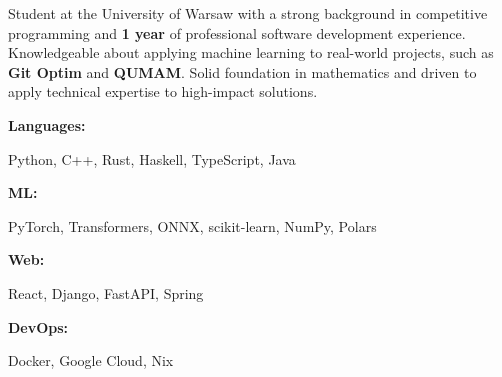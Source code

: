 \documentclass[8pt]{developercv} %
\begin{document}

\begin{minipage}[t]{0.45\textwidth}
	\vspace{-6pt}
 
	Student at the University of Warsaw with a strong background in competitive programming and \textbf{1 year} of professional software development experience. Knowledgeable about applying machine learning to real-world projects, such as \textbf{Git Optim} and \textbf{QUMAM}. Solid foundation in mathematics and driven to apply technical expertise to high-impact solutions.
\end{minipage}
\hfill %
\begin{minipage}[t]{0.50\textwidth}
    \vspace{-6pt}
    
    \begin{minipage}[t]{0.15\textwidth}
        \textbf{Languages:}
    \end{minipage}
    \hfill
    \begin{minipage}[t]{0.75\textwidth}
    Python, C++, Rust, Haskell, TypeScript, Java
    \end{minipage}
    \vspace{2mm}
    
    \begin{minipage}[t]{0.15\textwidth}
        \textbf{ML:}
    \end{minipage}
    \hfill
    \begin{minipage}[t]{0.75\textwidth}
      PyTorch, Transformers, ONNX, scikit-learn, NumPy, Polars
    \end{minipage}
    \vspace{2mm}

    \begin{minipage}[t]{0.15\textwidth}
        \textbf{Web:}
    \end{minipage}
    \hfill
    \begin{minipage}[t]{0.75\textwidth}
      React, Django, FastAPI, Spring
    \end{minipage}
    \vspace{2mm}

    \begin{minipage}[t]{0.14\textwidth}
        \textbf{DevOps:}
    \end{minipage}
    \hfill
    \begin{minipage}[t]{0.76\textwidth}
     Docker, Google Cloud, Nix
    \end{minipage}
\end{minipage}
\end{document}
